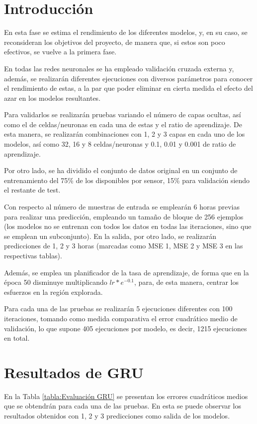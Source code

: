
\section{Introducción}
En esta fase se estima el rendimiento de los diferentes modelos, y, en su caso, 
se reconsideran los objetivos del proyecto, de manera que, si estos son poco efectivos,
se vuelve a la primera fase.

En todas las redes neuronales se ha empleado validación cruzada externa y, además, se realizarán
diferentes ejecuciones con diversos parámetros para conocer el rendimiento de estas, a 
la par que poder eliminar en cierta medida el efecto del azar en los modelos 
resultantes.

Para validarlos se realizarán pruebas variando el número de capas
ocultas, así como el de celdas/neuronas en cada una de estas y el ratio de aprendizaje.
De esta manera, se realizarán combinaciones con 1, 2 y 3 capas en cada uno de los modelos, 
así como 32, 16 y 8 celdas/neuronas y 0.1, 0.01 y 0.001 de ratio de aprendizaje. 

Por otro lado, se ha dividido el conjunto de datos original en un conjunto de entrenamiento del 75\% de los disponibles
por sensor, 15\% para validación siendo el restante de test.

Con respecto al número de muestras de entrada se emplearán 6 horas previas para realizar
una predicción, empleando un tamaño de bloque de 256 ejemplos (los modelos 
no se entrenan con todos los datos en todas las iteraciones, sino que se emplean un subconjunto).
En la salida, por otro lado, se realizarán predicciones de 1, 2 y 3 horas (marcadas como MSE 1, MSE 2 y MSE 3 en las
respectivas tablas).

Además, se emplea un planificador de la tasa de aprendizaje, de forma
que en la época 50 disminuye multiplicando \(lr * e^{-0.1}\), para, de esta manera,
centrar los esfuerzos en la región explorada.

Para cada una de las pruebas se realizarán 5 ejecuciones diferentes con 100 iteraciones, 
tomando como medida comparativa el error cuadrático medio de validación, lo que supone 405 ejecuciones por modelo, es decir, 1215 ejecuciones en total.

\newpage

\section{Resultados de GRU}
En la Tabla \ref{tabla:Evaluación GRU} se presentan los errores cuadráticos medios
que se obtendrán para cada una de las pruebas. En esta se puede observar los resultados obtenidos con 1, 2 y 3 predicciones 
como salida de los modelos. 

